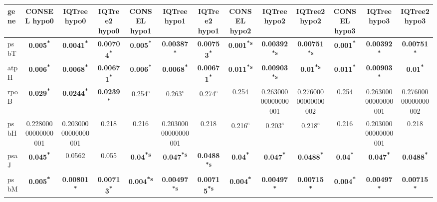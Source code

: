 \documentclass[a4paper]{article}
\begin{document}
\footnotesize
{}
\begin{longtable}{l|c|c|c|c|c|c|c|c|c|c|c|c}
﻿gene&CONSEL hypo0&IQTree hypo0&IQTree2 hypo0&CONSEL hypo1&IQTree hypo1&IQTree2 hypo1&CONSEL hypo2&IQTree hypo2&IQTree2 hypo2&CONSEL hypo3&IQTree hypo3&IQTree2 hypo3\\
\hline
\endhead
psbT&\textbf{0.005\textsuperscript{*}}&\textbf{0.0041\textsuperscript{*}}&\textbf{0.00704\textsuperscript{*}}&\textbf{0.005\textsuperscript{*}}&\textbf{0.00387\textsuperscript{*}}&\textbf{0.00753\textsuperscript{*}}&\textbf{0.001\textsuperscript{*}\textsuperscript{s}}&\textbf{0.00392\textsuperscript{*}\textsuperscript{s}}&\textbf{0.00751\textsuperscript{*}\textsuperscript{s}}&\textbf{0.001\textsuperscript{*}}&\textbf{0.00392\textsuperscript{*}}&\textbf{0.00751\textsuperscript{*}}\\
atpH&\textbf{0.006\textsuperscript{*}}&\textbf{0.0068\textsuperscript{*}}&\textbf{0.00671\textsuperscript{*}}&\textbf{0.006\textsuperscript{*}}&\textbf{0.0068\textsuperscript{*}}&\textbf{0.00671\textsuperscript{*}}&\textbf{0.011\textsuperscript{*}\textsuperscript{s}}&\textbf{0.00903\textsuperscript{*}\textsuperscript{s}}&\textbf{0.01\textsuperscript{*}\textsuperscript{s}}&\textbf{0.011\textsuperscript{*}}&\textbf{0.00903\textsuperscript{*}}&\textbf{0.01\textsuperscript{*}}\\
rpoB&\textbf{0.029\textsuperscript{*}}&\textbf{0.0244\textsuperscript{*}}&\textbf{0.0239\textsuperscript{*}}&0.254\textsuperscript{s}&0.263\textsuperscript{s}&0.274\textsuperscript{s}&0.254&0.26300000000000001&0.27600000000000002&0.254&0.26300000000000001&0.27600000000000002\\
psbH&0.22800000000000001&0.20300000000000001&0.218&0.216&0.20300000000000001&0.218&0.216\textsuperscript{s}&0.203\textsuperscript{s}&0.218\textsuperscript{s}&0.216&0.20300000000000001&0.218\\
psaJ&\textbf{0.045\textsuperscript{*}}&0.0562&0.055&\textbf{0.04\textsuperscript{*}\textsuperscript{s}}&\textbf{0.047\textsuperscript{*}\textsuperscript{s}}&\textbf{0.0488\textsuperscript{*}\textsuperscript{s}}&\textbf{0.04\textsuperscript{*}}&\textbf{0.047\textsuperscript{*}}&\textbf{0.0488\textsuperscript{*}}&\textbf{0.04\textsuperscript{*}}&\textbf{0.047\textsuperscript{*}}&\textbf{0.0488\textsuperscript{*}}\\
psbM&\textbf{0.005\textsuperscript{*}}&\textbf{0.00801\textsuperscript{*}}&\textbf{0.00713\textsuperscript{*}}&\textbf{0.004\textsuperscript{*}\textsuperscript{s}}&\textbf{0.00497\textsuperscript{*}\textsuperscript{s}}&\textbf{0.00715\textsuperscript{*}\textsuperscript{s}}&\textbf{0.004\textsuperscript{*}}&\textbf{0.00497\textsuperscript{*}}&\textbf{0.00715\textsuperscript{*}}&\textbf{0.004\textsuperscript{*}}&\textbf{0.00497\textsuperscript{*}}&\textbf{0.00715\textsuperscript{*}}\\

\end{longtable}
\end{document}
